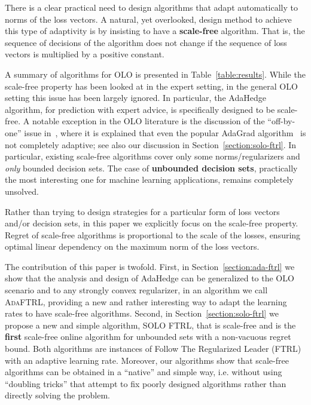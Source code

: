

There is a clear practical need to design algorithms that adapt automatically
to norms of the loss vectors.  A natural, yet overlooked, design method to
achieve this type of adaptivity is by insisting to have a \textbf{scale-free}
algorithm.  That is, the sequence of decisions of the algorithm does not change
if the sequence of loss vectors is multiplied by a positive constant.

A summary of algorithms for OLO is presented in Table~\ref{table:results}.
While the scale-free property has been looked at in the expert setting, in the
general OLO setting this issue has been largely ignored.  In particular, the
AdaHedge~\cite{de-Rooij-van-Erven-Grunwald-Koolen-2014} algorithm, for
prediction with expert advice, is specifically designed to be scale-free.  A
notable exception in the OLO literature is the discussion of the ``off-by-one''
issue in~\cite{McMahan-2014}, where it is explained that even the popular AdaGrad
algorithm~\cite{Duchi-Hazan-Singer-2011} is not completely adaptive; see also
our discussion in Section~\ref{section:solo-ftrl}. In particular, existing
scale-free algorithms cover only some norms/regularizers and \emph{only}
bounded decision sets. The case of \textbf{unbounded decision sets},
practically the most interesting one for machine learning applications, remains
completely unsolved.

Rather than trying to design strategies for a particular form of loss
vectors and/or decision sets, in this paper we explicitly focus on the
scale-free property. Regret of scale-free algorithms is proportional to the
scale of the losses, ensuring optimal linear dependency on the maximum norm of
the loss vectors.

The contribution of this paper is twofold. First, in
Section~\ref{section:ada-ftrl} we show that the analysis and design of
AdaHedge can be generalized to the OLO scenario and to any strongly convex
regularizer, in an algorithm we call \textsc{AdaFTRL}, providing a new and
rather interesting way to adapt the learning rates to have scale-free
algorithms.  Second, in Section~\ref{section:solo-ftrl} we propose a new and
simple algorithm, \textsc{SOLO FTRL}, that is scale-free and is the
\textbf{first} scale-free online algorithm for unbounded sets with a
non-vacuous regret bound.  Both algorithms are instances of Follow The
Regularized Leader (FTRL) with an adaptive learning rate.  Moreover, our
algorithms show that scale-free algorithms can be obtained in a ``native'' and
simple way, i.e.  without using ``doubling tricks'' that attempt to fix poorly
designed algorithms rather than directly solving the problem.

